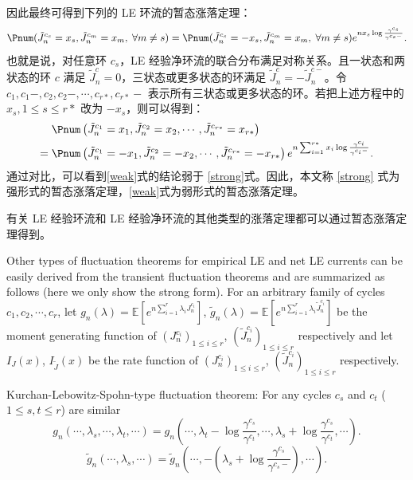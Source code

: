 因此最终可得到下列的 LE 环流的暂态涨落定理：
\begin{equation}\label{strong}
\Pnum(\tilde{J}^{c_s}_n=x_s,\tilde{J}^{c_m}_n=x_m,\;\forall m\neq s) \\
= \Pnum(\tilde{J}^{c_s}_n=-x_s,\tilde{J}^{c_m}_n=x_m,\;\forall m\neq s)e^{nx_s\log\frac{\gamma^{c_s}}{\gamma^{c_s-}}}.
\end{equation}
也就是说，对任意环 $c_s$，LE 经验净环流的联合分布满足对称关系。且一状态和两状态的环 $c$ 满足 $\tilde{J}^c_n=0$，三状态或更多状态的环满足 $\tilde{J}^c_n=-\tilde{J}^{c-}_n$。令 $c_1,c_1-,c_2,c_2-,\cdots,c_{r*},c_{r*}-$ 
表示所有三状态或更多状态的环。若把上述方程中的 $x_s, 1\leq s\leq r*$ 改为 $-x_s$，则可以得到：
\begin{equation}\label{weak}
    \begin{split}
    &\;\Pnum\left(\tilde{J}^{c_1}_n=x_1,\tilde{J}^{c_2}_n=x_2,\cdots,\tilde{J}^{c_{r*}}_n=x_{r*}\right)\\
    =&\; \Pnum\left(\tilde{J}^{c_1}_n=-x_1,\tilde{J}^{c_2}_n=-x_2,\cdots,\tilde{J}^{c_{r*}}_n=-x_{r*}\right)
    e^{n\sum_{i=1}^{r*}x_i\log\frac{\gamma^{c_i}}{\gamma^{c_i-}}}.
    \end{split}
\end{equation}
通过对比，可以看到\eqref{weak}式的结论弱于 \eqref{strong}式。因此，本文称 \eqref{strong} 式为强形式的暂态涨落定理，\eqref{weak}式为弱形式的暂态涨落定理。

有关 LE 经验环流和 LE 经验净环流的其他类型的涨落定理都可以通过暂态涨落定理得到。

Other types of fluctuation theorems for empirical LE and net LE currents can be easily derived from the transient fluctuation theorems and are summarized as follows (here we only show the strong form). For an arbitrary family of cycles $c_1,c_2,\cdots,c_r$, let $g_n(\lambda) = \mathbb{E}[e^{n\sum_{i=1}^r\lambda_iJ^{c_i}_n}]$, $\tilde{g}_n(\lambda) = \mathbb{E}[e^{n\sum_{i=1}^{r}\lambda_i\tilde{J}^{c_i}_n}]$ be the moment generating function of $(J^{c_i}_n)_{1\le i\le r}$, $(\tilde{J}^{c_i}_n)_{1\le i\le r}$ respectively and let $I_{J}(x)$, $I_{\tilde{J}}(x)$ be the rate function of $(J^{c_i}_n)_{1\le i\le r}$, $(\tilde{J}^{c_i}_n)_{1\le i\le r}$ respectively.

Kurchan-Lebowitz-Spohn-type fluctuation theorem: For any cycles $c_s$ and $c_t$ ($1\le s,t\le r$) are similar
\begin{equation*}
	g_n(\cdots,\lambda_s,\cdots,\lambda_t,\cdots) = g_n\left(\cdots,\lambda_t-\log\frac{\gamma^{c_s}}{\gamma^{c_t}},\cdots,\lambda_s+\log\frac{\gamma^{c_s}}{\gamma^{c_t}},\cdots\right).
\end{equation*}
\begin{equation*}
	\tilde{g}_n(\cdots,\lambda_s,\cdots)=\tilde{g}_n\left(\cdots,-\left(\lambda_s+\log\frac{\gamma^{c_s}}{\gamma^{c_s-}}\right),\cdots\right).
\end{equation*}

